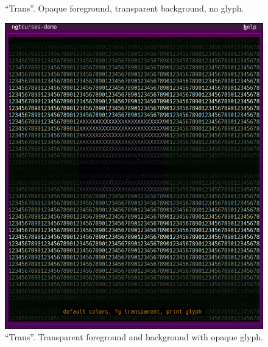 \documentclass[letterpaper,10pt]{article}
\begin{document}
\begin{figure}
\begin{minipage}{0.30\textwidth}
    \caption[``Trans'', middle phase.]{``Trans''. Opaque foreground, transparent background, no glyph.}
  \end{minipage}\hfill
  \begin{minipage}{0.30\textwidth}
    \includegraphics[width=1\linewidth]{media/demo-trans3.png}
    \caption[``Trans'', late phase.]{``Trans''. Transparent foreground and background
         with opaque glyph.}
  \end{minipage}\hfill
\end{figure}
\end{document}
